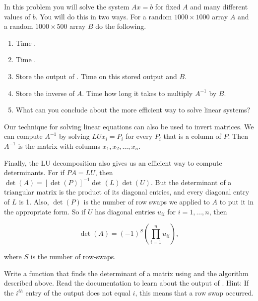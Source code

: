 \begin{problem}\label{prob:solve}
In this problem you will solve the system $Ax = b$ for fixed $A$ and many different values of $b$. 
You will do this in two ways. 
For a random $1000 \times 1000$ array $A$ and a random $1000 \times 500$ array $B$ do the following.
\begin{enumerate}
\item Time .
\item Time .
\item Store the output of . Time  on this stored output and $B$.
\item Store the inverse of $A$. Time how long it takes to multiply $A^{-1}$ by $B$.
\item What can you conclude about the more efficient way to solve linear systems?
\end{enumerate}
\end{problem}


Our technique for solving linear equations can also be used to invert matrices. 
We can compute $A^{-1}$ by solving $LUx_i = P_i$ for every $P_i$ that is a column of $P$. 
Then $A^{-1}$ is the matrix with columns $x_1, x_2, \ldots, x_n$. 

Finally, the LU decomposition also gives us an efficient way to compute determinants. 
For if $PA=LU$, then $\det(A) = [\det(P)]^{-1}\det(L)\det(U)$. 
But the determinant of a triangular matrix is the product of its diagonal entries, and every diagonal entry of $L$ is 1. 
Also, $\det(P)$ is the number of row swaps we applied to $A$ to put it in the appropriate form. 
So if $U$ has diagonal entries $u_{ii}$ for $i=1, \ldots, n$, then

\[
\det(A) = (-1)^S\left(\displaystyle\prod_{i=1}^nu_{ii}\right),
\]

where $S$ is the number of row-swaps.



%

\begin{problem}[Optional]
\label{prob:det}
Write a function that finds the determinant of a matrix using  and the algorithm described above. 
Read the documentation to learn about the output of .
Hint: If the $i^{th}$ entry of the output  does not equal $i$, this means that a row swap occurred.
\end{problem}

